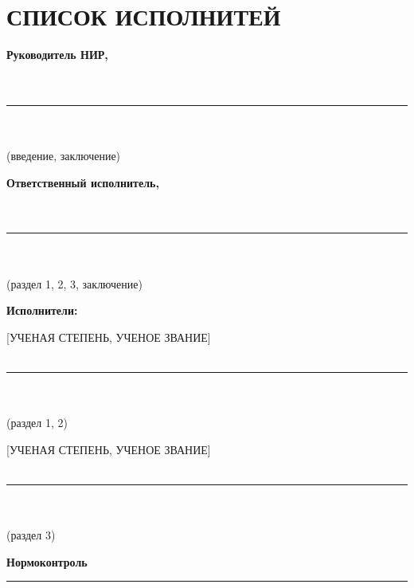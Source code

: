 \chapter*{СПИСОК ИСПОЛНИТЕЙ}

\vspace{1cm}

\begin{center}
\textbf{Руководитель НИР,}\\
[УЧЕНАЯ СТЕПЕНЬ, УЧЕНОЕ ЗВАНИЕ]\\
[ДОЛЖНОСТЬ]\\
\vspace{0.5cm}
\rule{6cm}{0.4pt}\\
[ФАМИЛИЯ И.О.]\\
(введение, заключение)
\end{center}

\vspace{1cm}

\begin{center}
\textbf{Ответственный исполнитель,}\\
[УЧЕНАЯ СТЕПЕНЬ, УЧЕНОЕ ЗВАНИЕ]\\
[ДОЛЖНОСТЬ]\\
\vspace{0.5cm}
\rule{6cm}{0.4pt}\\
[ФАМИЛИЯ И.О.]\\
(раздел 1, 2, 3, заключение)
\end{center}

\vspace{1cm}

\textbf{Исполнители:}

\begin{center}
[УЧЕНАЯ СТЕПЕНЬ, УЧЕНОЕ ЗВАНИЕ]\\
[ДОЛЖНОСТЬ]\\
\vspace{0.5cm}
\rule{6cm}{0.4pt}\\
[ФАМИЛИЯ И.О.]\\
(раздел 1, 2)
\end{center}

\vspace{1cm}

\begin{center}
[УЧЕНАЯ СТЕПЕНЬ, УЧЕНОЕ ЗВАНИЕ]\\
[ДОЛЖНОСТЬ]\\
\vspace{0.5cm}
\rule{6cm}{0.4pt}\\
[ФАМИЛИЯ И.О.]\\
(раздел 3)
\end{center}

\vspace{1cm}

\begin{center}
\textbf{Нормоконтроль}\\
\vspace{0.5cm}
\rule{6cm}{0.4pt}\\
[ФАМИЛИЯ И.О.]
\end{center}
